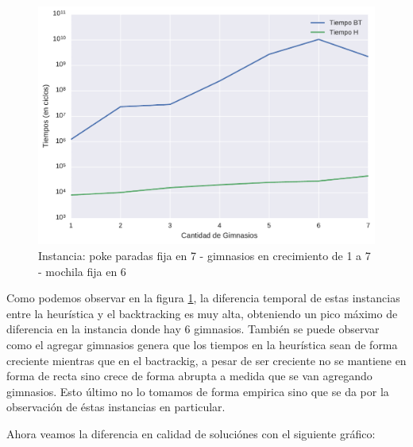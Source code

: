 \begin{figure}[H]
  \begin{center}
    \includegraphics[scale=0.8]{imagenes/ej2test1hvsbttiemposa.pdf}
    \caption{Instancia: poke paradas fija en 7 - gimnasios en crecimiento de 1 a 7 - mochila fija en 6}
    \label{ej2test1a}
  \end{center}
\end{figure}

Como podemos observar en la figura \ref{ej2test1a}, la diferencia temporal de estas instancias entre la heurística y el backtracking es muy alta, obteniendo un pico máximo de diferencia en la instancia donde hay 6 gimnasios. También se puede observar como el agregar gimnasios genera que los tiempos en la heurística sean de forma creciente mientras que en el bactrackig, a pesar de ser creciente no se mantiene en forma de recta sino crece de forma abrupta a medida que se van agregando gimnasios. Esto último no lo tomamos de forma empirica sino que se da por la observación de éstas instancias en particular.

\newpage
Ahora veamos la diferencia en calidad de soluciónes con el siguiente gráfico:

